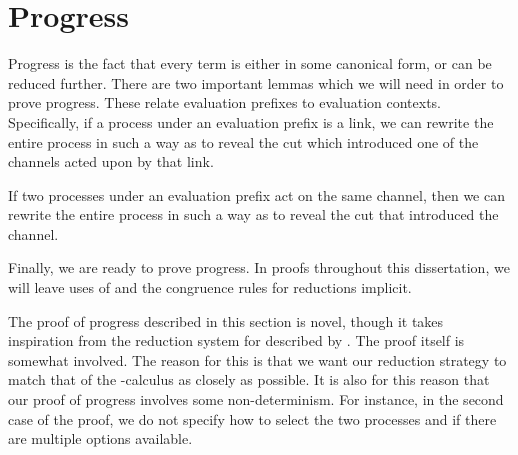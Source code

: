 \section{Progress}\label{sec:cp-progress}
Progress is the fact that every term is either in some canonical form, or can be
reduced further.
%
There are two important lemmas which we will need in order to prove progress.
These relate evaluation prefixes to evaluation contexts.
%
Specifically, if a process under an evaluation prefix is a link, we can rewrite
the entire process in such a way as to reveal the cut which introduced one of
the channels acted upon by that link.

If two processes under an evaluation prefix act on the same channel, then we
can rewrite the entire process in such a way as to reveal the cut that 
introduced the channel. 


Finally, we are ready to prove progress.
In proofs throughout this dissertation, we will leave uses of
\cpRedGammaEquiv and the congruence rules for reductions implicit. 

The proof of progress described in this section is novel, though it takes
inspiration from the reduction system for \cp described by \textcite{lindley2015semantics}. 
The proof itself is somewhat involved. The reason for this is that we want our
reduction strategy to match that of the \textpi-calculus as closely as possible.
It is also for this reason that our proof of progress involves some
non-determinism. For instance, in the second case of the proof, we do not
specify how to select the two processes  and  if there are
multiple options available.

